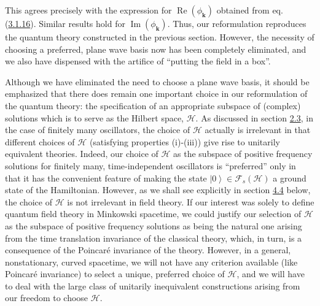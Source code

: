 \documentclass[11pt,a4paper]{article}
\providecommand{\ket}[1]{\left\lvert#1\right\rangle}
\begin{document}
This agrees precisely with the expression for \(\operatorname{Re}(\phi_{\mathbf{k}})\) obtained from eq. (\hyperref[eq:3.1.16]{3.1.16}). Similar results hold for \(\operatorname{Im}(\phi_{\mathbf k})\). Thus, our reformulation reproduces the quantum theory constructed in the previous section. However, the necessity of choosing a preferred, plane wave basis now has been completely eliminated, and we also have dispensed with the artifice of ``putting the field in a box''.

Although we have eliminated the need to choose a plane wave basis, it should be emphasized that there does remain one important \hypertarget{source-53}{} choice in our reformulation of the quantum theory: the specification of an appropriate subspace of (complex) solutions which is to serve as the Hilbert space, \(\mathcal{H}\). As discussed in section \hyperlink{sec:2.3}{2.3}, in the case of finitely many oscillators, the choice of \(\mathcal{H}\) actually is irrelevant in that different choices of \(\mathcal{H}\) (satisfying properties (i)-(iii)) give rise to unitarily equivalent theories. Indeed, our choice of \(\mathcal{H}\) as the subspace of positive frequency solutions for finitely many, time-independent oscillators is ``preferred'' only in that it has the convenient feature of making the state \(\ket{0} \in \mathcal{F}_s(\mathcal{H})\) a ground state of the Hamiltonian. However, as we shall see explicitly in section \hyperlink{sec:4.4}{4.4} below, the choice of \(\mathcal{H}\) is not irrelevant in field theory. If our interest was solely to define quantum field theory in Minkowski spacetime, we could justify our selection of \(\mathcal{H}\) as the subspace of positive frequency solutions as being the natural one arising from the time translation invariance of the classical theory, which, in turn, is a consequence of the Poincaré invariance of the theory. However, in a general, nonstationary, curved spacetime, we will not have any criterion available (like Poincaré invariance) to select a unique, preferred choice of \(\mathcal{H}\), and we will have to deal with the large class of unitarily inequivalent constructions arising from our freedom to choose \(\mathcal{H}\).
\end{document}
